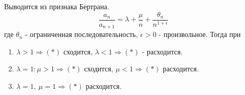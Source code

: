 \begin{examples}
\begin{enumerate}
        Выводится из признака Бертрана.\\
        \[\frac{a_n}{a_{n+1}}=\lambda+\frac{\mu}{n}+\frac{\theta_n}{n^{1+\epsilon}}\]
        где $\theta_n$ - ограниченная последовательность, $\epsilon>0$ - произвольное. Тогда при
        \begin{enumerate}
            \item $\lambda>1 \Rightarrow (*)$ сходится, $\lambda<1 \Rightarrow (*)$ - расходится.
            \item $\lambda=1: \mu>1 \Rightarrow (*)$ сходится, $\mu<1 \Rightarrow (*)$ расходится.
            \item $\lambda=1,\ \mu=1 \Rightarrow (*)$ расходится.  
        \end{enumerate}
    \end{enumerate}
\end{examples}

